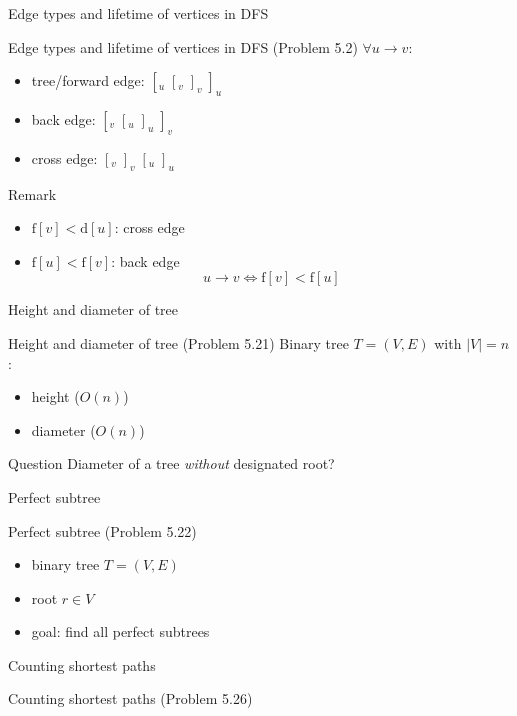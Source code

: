 \begin{frame}{Edge types and lifetime of vertices in DFS}
  \begin{exampleblock}{Edge types and lifetime of vertices in DFS (Problem 5.2)}
    $\forall u \to v$:
    \begin{itemize}
      \item tree/forward edge: $[_{u}\; [_{v}\; ]_{v}\; ]_{u}$
      \item back edge: $[_{v}\; [_{u}\; ]_{u}\; ]_{v}$
      \item cross edge: $[_{v}\; ]_{v}\; [_{u}\; ]_{u}$
    \end{itemize}
  \end{exampleblock}

  \pause

  \begin{alertblock}{Remark}
    \begin{itemize}
      \item $\text{f}[v] < \text{d}[u]$: cross edge
      \item $\text{f}[u] < \text{f}[v]$: back edge
		\pause
		\[
		  u \to v \iff \text{f}[v] < \text{f}[u]
		\]
    \end{itemize}
  \end{alertblock}
\end{frame}
\begin{frame}{Height and diameter of tree}
  \begin{exampleblock}{Height and diameter of tree (Problem 5.21)}
	Binary tree $T = (V, E)$ with $|V| = n$:
	\begin{itemize}
	  \item height ($O(n)$)
	  \item diameter ($O(n)$)
	\end{itemize}
  \end{exampleblock}

  \begin{alertblock}{Question}
	Diameter of a tree \emph{without} designated root?
  \end{alertblock}
\end{frame}
\begin{frame}{Perfect subtree}
  \begin{exampleblock}{Perfect subtree (Problem 5.22)}
	\begin{itemize}
	  \item binary tree $T = (V, E)$
	  \item root $r \in V$
	  \item goal: find all perfect subtrees
	\end{itemize}
  \end{exampleblock}
\end{frame}
\begin{frame}{Counting shortest paths}
  \begin{exampleblock}{Counting shortest paths (Problem 5.26)}
  \end{exampleblock}
\end{frame}
